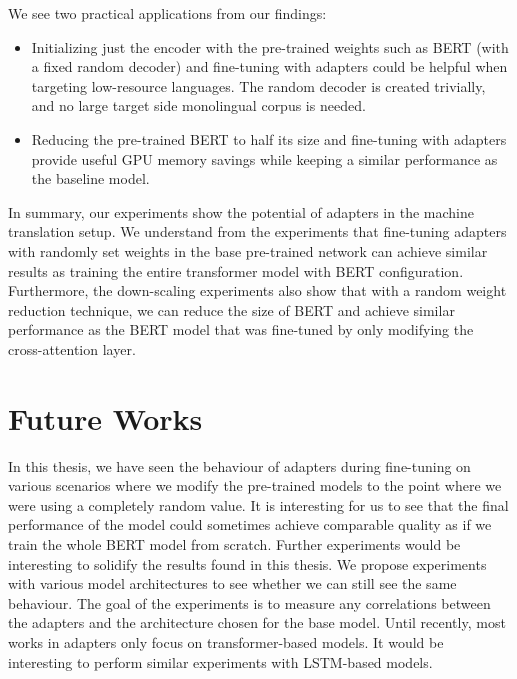 We see two practical applications from our findings:
\begin{itemize}
    \item Initializing just the encoder with the pre-trained weights such as BERT (with a fixed random decoder) and fine-tuning with adapters could be helpful when targeting low-resource languages. The random decoder is created trivially, and no large target side monolingual corpus is needed.
    \item Reducing the pre-trained BERT to half its size and fine-tuning with adapt\-ers provide useful GPU memory savings while keeping a similar performance as the baseline model.
\end{itemize}

In summary, our experiments show the potential of adapters in the machine translation setup. We understand from the experiments that fine-tuning adapters with randomly set weights in the base pre-trained network can achieve similar results as training the entire transformer model with BERT configuration. Furthermore, the down-scaling experiments also show that with a random weight reduction technique, we can reduce the size of BERT and achieve similar performance as the BERT model that was fine-tuned by only modifying the cross-attention layer.

\section{Future Works}
In this thesis, we have seen the behaviour of adapters during fine-tuning on various scenarios where we modify the pre-trained models to the point where we were using a completely random value. It is interesting for us to see that the final performance of the model could sometimes achieve comparable quality as if we train the whole BERT model from scratch. Further experiments would be interesting to solidify the results found in this thesis. We propose experiments with various model architectures to see whether we can still see the same behaviour. The goal of the experiments is to measure any correlations between the adapters and the architecture chosen for the base model. Until recently, most works in adapters only focus on transformer-based models. It would be interesting to perform similar experiments with LSTM-based models.

